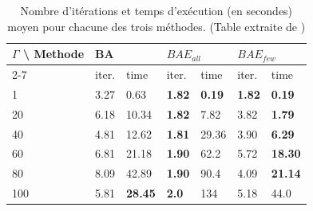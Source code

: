 \documentclass[12pt, a4paper, twoside]{report}
\numberwithin{equation}{section}
\begin{document}
	\begin{table}[H]
		\label{tb:res_initiaux}
		\centering
		\begin{tabular}{@{}|l|llllll@{}}
			\toprule
			\multirow{2}{*}{$\Gamma$ \textbackslash{} Methode} & \multicolumn{2}{l|}{BA}                                & \multicolumn{2}{l|}{$BAE_{all}$}                              & \multicolumn{2}{l|}{$BAE_{few}$}                              \\ \cmidrule(l){2-7} 
			& iter.                     & time                       & iter.                     & time                       & iter.                     & time                       \\ \midrule
			1                                             & \multicolumn{1}{l|}{3.27} & \multicolumn{1}{l|}{0.63}  & \multicolumn{1}{l|}{\textbf{1.82}} & \multicolumn{1}{l|}{\textbf{0.19}}  & \multicolumn{1}{l|}{\textbf{1.82}} & \multicolumn{1}{l|}{\textbf{0.19}}  \\ \midrule
			20                                            & \multicolumn{1}{l|}{6.18} & \multicolumn{1}{l|}{10.34} & \multicolumn{1}{l|}{\textbf{1.82}} & \multicolumn{1}{l|}{7.82}  & \multicolumn{1}{l|}{3.82} & \multicolumn{1}{l|}{\textbf{1.79}}  \\ \midrule
			40                                            & \multicolumn{1}{l|}{4.81} & \multicolumn{1}{l|}{12.62} & \multicolumn{1}{l|}{\textbf{1.81}} & \multicolumn{1}{l|}{29.36} & \multicolumn{1}{l|}{3.90} & \multicolumn{1}{l|}{\textbf{6.29}}  \\ \midrule
			60                                            & \multicolumn{1}{l|}{6.81} & \multicolumn{1}{l|}{21.18} & \multicolumn{1}{l|}{\textbf{1.90}} & \multicolumn{1}{l|}{62.2}  & \multicolumn{1}{l|}{5.72} & \multicolumn{1}{l|}{\textbf{18.30}} \\ \midrule
			80                                            & \multicolumn{1}{l|}{8.09} & \multicolumn{1}{l|}{42.89} & \multicolumn{1}{l|}{\textbf{1.90}} & \multicolumn{1}{l|}{90.4}  & \multicolumn{1}{l|}{4.09} & \multicolumn{1}{l|}{\textbf{21.14}} \\ \midrule
			100                                           & \multicolumn{1}{l|}{5.81} & \multicolumn{1}{l|}{\textbf{28.45}} & \multicolumn{1}{l|}{\textbf{2.0}}  & \multicolumn{1}{l|}{134}   & \multicolumn{1}{l|}{5.18} & \multicolumn{1}{l|}{44.0}  \\ \bottomrule
		\end{tabular}
		\caption{Nombre d'itérations et temps d'exécution (en secondes) moyen pour chacune des trois méthodes. (Table extraite de \cite{portoleau:hal-03595446})}
	\end{table}
	
\end{document}
